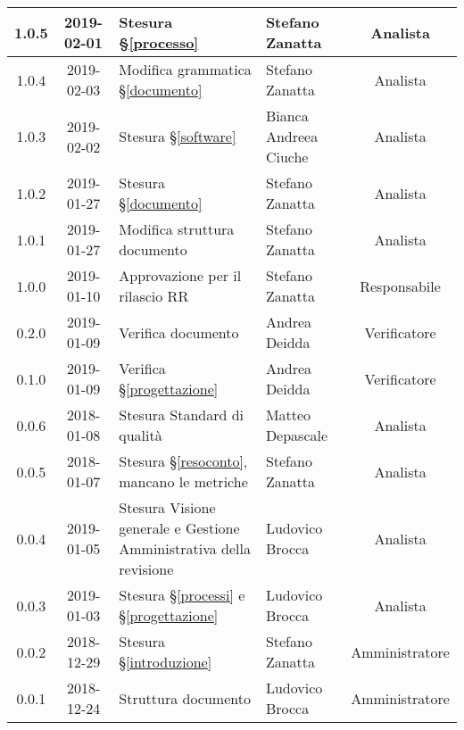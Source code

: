 \begin{center}
\begin{tabularx}{\textwidth}{|c|c|X|X|c|}
			1.0.5 & 2019-02-01 & Stesura \S\ref{processo}& Stefano Zanatta & Analista\\
			\hline
			1.0.4 & 2019-02-03 & Modifica grammatica \S\ref{documento}& Stefano Zanatta & Analista\\
			\hline
			1.0.3 & 2019-02-02 & Stesura \S\ref{software}& Bianca Andreea Ciuche & Analista\\
			\hline
			1.0.2 & 2019-01-27 & Stesura \S\ref{documento}& Stefano Zanatta & Analista\\
			\hline
			1.0.1 & 2019-01-27 & Modifica struttura documento & Stefano Zanatta & Analista\\
			\hline
			1.0.0 & 2019-01-10 & Approvazione per il rilascio RR & Stefano Zanatta & Responsabile\\
			\hline
			0.2.0 & 2019-01-09 & Verifica documento & Andrea Deidda & Verificatore\\
			\hline
			0.1.0 & 2019-01-09 & Verifica \S\ref{progettazione} & Andrea Deidda & Verificatore\\
			\hline
			0.0.6 & 2018-01-08 & Stesura Standard di qualità & Matteo Depascale & Analista\\
			\hline
			0.0.5 & 2018-01-07 & Stesura \S\ref{resoconto}, mancano le metriche & Stefano Zanatta & Analista\\
			\hline
			0.0.4 & 2019-01-05 & Stesura Visione generale e Gestione Amministrativa della revisione  & Ludovico Brocca& Analista\\
			\hline
			0.0.3 & 2019-01-03& Stesura \S\ref{processi} e \S\ref{progettazione} &Ludovico Brocca & Analista\\
			\hline
			0.0.2 & 2018-12-29 & Stesura \S\ref{introduzione} & Stefano Zanatta & Amministratore\\
			\hline
			0.0.1 & 2018-12-24 & Struttura documento & Ludovico Brocca & Amministratore\\
			\hline
		\end{tabularx}
	\end{center}
\newpage
